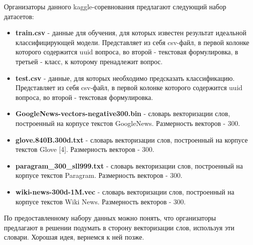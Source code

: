 Организаторы данного kaggle-соревнования предлагают следующий набор датасетов:
\begin{itemize}
\item \textbf{train.csv} - данные для обучения, для которых известен результат идеальной классифицирующей модели. Представляет из себя csv-файл, в первой колонке которого содержится uuid вопроса, во второй - текстовая формулировка, в третьей - класс, к которому пренадлежит вопрос.

\item \textbf{test.csv} - данные, для которых необходимо предсказать классификацию. Представляет из себя csv-файл, в первой колонке которого содержится uuid вопроса, во второй - текстовая формулировка.\\

\item \textbf{GoogleNews-vectors-negative300.bin} - словарь векторизации слов, построенный на корпусе текстов GoogleNews. Размерность векторов - 300.
\item \textbf{glove.840B.300d.txt} - словарь векторизации слов, построенный на корпусе текстов Glove [4]. Размерность векторов - 300.
\item \textbf{paragram\_300\_sll999.txt} - словарь векторизации слов, построенный на корпусе текстов Paragram. Размерность векторов - 300.
\item \textbf{wiki-news-300d-1M.vec} - словарь векторизации слов, построенный на корпусе текстов Wiki News. Размерность векторов - 300.
\end{itemize}

По предоставленному набору данных можно понять, что организаторы предлагают в решении подумать в сторону векторизации слов, используя эти словари. Хорошая идея, вернемся к ней позже.


\pagebreak





